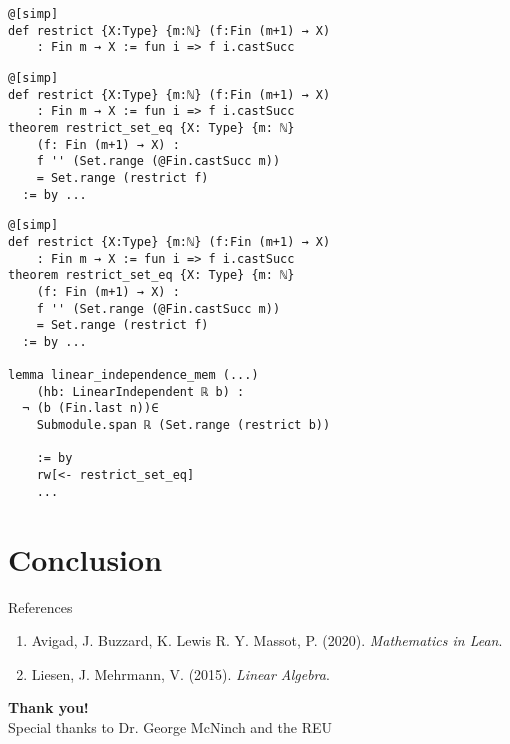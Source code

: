 \documentclass{beamer}
\begin{document}
\newpage

\begin{verbatim}
@[simp]
def restrict {X:Type} {m:ℕ} (f:Fin (m+1) → X) 
    : Fin m → X := fun i => f i.castSucc
\end{verbatim}

\newpage

\begin{verbatim}
@[simp]
def restrict {X:Type} {m:ℕ} (f:Fin (m+1) → X) 
    : Fin m → X := fun i => f i.castSucc
theorem restrict_set_eq {X: Type} {m: ℕ} 
    (f: Fin (m+1) → X) :    
    f '' (Set.range (@Fin.castSucc m))
    = Set.range (restrict f)
  := by ...
\end{verbatim}

\newpage


\begin{verbatim}
@[simp]
def restrict {X:Type} {m:ℕ} (f:Fin (m+1) → X) 
    : Fin m → X := fun i => f i.castSucc
theorem restrict_set_eq {X: Type} {m: ℕ} 
    (f: Fin (m+1) → X) :    
    f '' (Set.range (@Fin.castSucc m))
    = Set.range (restrict f)
  := by ...

lemma linear_independence_mem (...)
    (hb: LinearIndependent ℝ b) :
  ¬ (b (Fin.last n))∈ 
    Submodule.span ℝ (Set.range (restrict b)) 
    
    := by
    rw[<- restrict_set_eq]
    ...
\end{verbatim}



\newpage

\section{Conclusion}

\begin{frame}{References}
\begin{enumerate}
\item Avigad, J. Buzzard, K. Lewis R. Y. Massot, P. (2020). \textit{Mathematics in Lean}. 
\item Liesen, J. Mehrmann, V. (2015). \textit{Linear Algebra}. 

\end{enumerate}
\end{frame}

\begin{frame}
	    \begin{center}
	        \textbf{Thank you!}\\
	        
	        Special thanks to Dr. George McNinch and the REU
         \bigbreak
         \LARGE
       
	    \end{center}
\end{frame}

    
\end{document}
